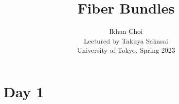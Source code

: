 \documentclass{../../small}
\begin{document}
\title{Fiber Bundles}
\author{Ikhan Choi\\Lectured by Takuya Sakasai\\University of Tokyo, Spring 2023}
\maketitle
\tableofcontents

\newpage
\section{Day 1}
\end{document}
